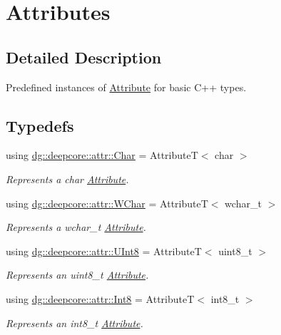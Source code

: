 \hypertarget{group___process_attributes}{}\section{Attributes}
\label{group___process_attributes}


\subsection{Detailed Description}
Predefined instances of \hyperlink{classdg_1_1deepcore_1_1_attribute}{Attribute} for basic C++ types. 

\subsection*{Typedefs}
\begin{DoxyCompactItemize}
\item 
using \hyperlink{group___process_attributes_gadac20aec5181f1e94408c0a195f5515a}{dg\+::deepcore\+::attr\+::\+Char} = AttributeT$<$ char $>$
\begin{DoxyCompactList}\small\item\em Represents a {\ttfamily char} \hyperlink{classdg_1_1deepcore_1_1_attribute}{Attribute}. \end{DoxyCompactList}\item 
using \hyperlink{group___process_attributes_gaae8956988d8184c8612522c0f7bf95f3}{dg\+::deepcore\+::attr\+::\+W\+Char} = AttributeT$<$ wchar\+\_\+t $>$
\begin{DoxyCompactList}\small\item\em Represents a {\ttfamily wchar\+\_\+t} \hyperlink{classdg_1_1deepcore_1_1_attribute}{Attribute}. \end{DoxyCompactList}\item 
using \hyperlink{group___process_attributes_ga9ee0103d6f3e94f58f86fb9b7c17ef4d}{dg\+::deepcore\+::attr\+::\+U\+Int8} = AttributeT$<$ uint8\+\_\+t $>$
\begin{DoxyCompactList}\small\item\em Represents an {\ttfamily uint8\+\_\+t} \hyperlink{classdg_1_1deepcore_1_1_attribute}{Attribute}. \end{DoxyCompactList}\item 
using \hyperlink{group___process_attributes_ga2024098683e1d9f9139de3e51952ea59}{dg\+::deepcore\+::attr\+::\+Int8} = AttributeT$<$ int8\+\_\+t $>$
\begin{DoxyCompactList}\small\item\em Represents an {\ttfamily int8\+\_\+t} \hyperlink{classdg_1_1deepcore_1_1_attribute}{Attribute}. \end{DoxyCompactList}\item 

\end{DoxyCompactItemize}
